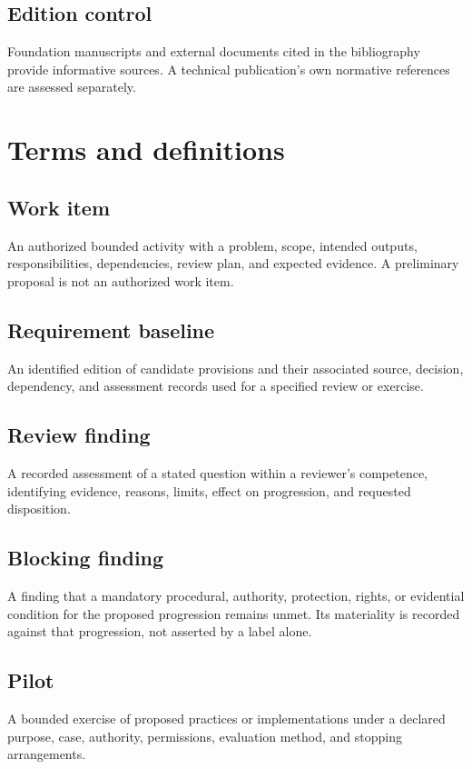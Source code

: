 \documentclass[11pt,a4paper]{article}
\begin{document}
\subsection{Edition control}
Foundation manuscripts and external documents cited in the bibliography provide informative sources. A technical publication's own normative references are assessed separately.

\section{Terms and definitions}
\subsection{Work item}
An authorized bounded activity with a problem, scope, intended outputs, responsibilities, dependencies, review plan, and expected evidence. A preliminary proposal is not an authorized work item.

\subsection{Requirement baseline}
An identified edition of candidate provisions and their associated source, decision, dependency, and assessment records used for a specified review or exercise.

\subsection{Review finding}
A recorded assessment of a stated question within a reviewer's competence, identifying evidence, reasons, limits, effect on progression, and requested disposition.

\subsection{Blocking finding}
A finding that a mandatory procedural, authority, protection, rights, or evidential condition for the proposed progression remains unmet. Its materiality is recorded against that progression, not asserted by a label alone.

\subsection{Pilot}
A bounded exercise of proposed practices or implementations under a declared purpose, case, authority, permissions, evaluation method, and stopping arrangements.
\end{document}

